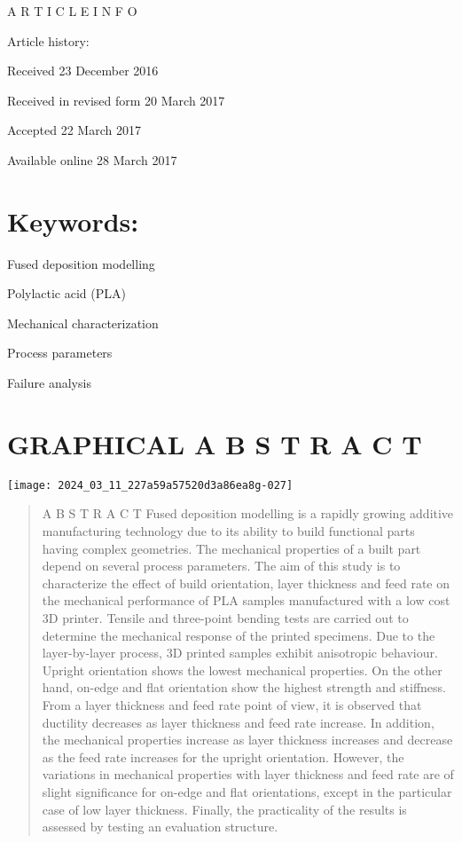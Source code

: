 \documentclass[10pt]{article}
\begin{document}
A R T I C L E I N F O

Article history:

Received 23 December 2016

Received in revised form 20 March 2017

Accepted 22 March 2017

Available online 28 March 2017

\section*{Keywords:}
Fused deposition modelling

Polylactic acid (PLA)

Mechanical characterization

Process parameters

Failure analysis

\section*{GRAPHICAL A B S T R A C T}
\begin{center}
\texttt{[image: 2024\_03\_11\_227a59a57520d3a86ea8g-027]}
\end{center}

\begin{abstract}
A B S T R A C T Fused deposition modelling is a rapidly growing additive manufacturing technology due to its ability to build functional parts having complex geometries. The mechanical properties of a built part depend on several process parameters. The aim of this study is to characterize the effect of build orientation, layer thickness and feed rate on the mechanical performance of PLA samples manufactured with a low cost 3D printer. Tensile and three-point bending tests are carried out to determine the mechanical response of the printed specimens. Due to the layer-by-layer process, 3D printed samples exhibit anisotropic behaviour. Upright orientation shows the lowest mechanical properties. On the other hand, on-edge and flat orientation show the highest strength and stiffness. From a layer thickness and feed rate point of view, it is observed that ductility decreases as layer thickness and feed rate increase. In addition, the mechanical properties increase as layer thickness increases and decrease as the feed rate increases for the upright orientation. However, the variations in mechanical properties with layer thickness and feed rate are of slight significance for on-edge and flat orientations, except in the particular case of low layer thickness. Finally, the practicality of the results is assessed by testing an evaluation structure.
\end{abstract}
\end{document}
